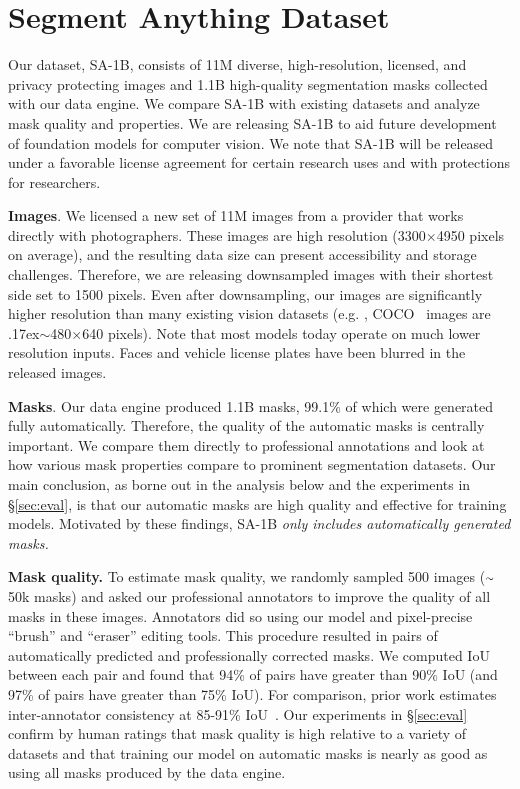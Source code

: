 \section{Segment Anything Dataset}\label{sec:dataset}

Our dataset, \mbox{SA-1B}, consists of 11M diverse, high-resolution, licensed, and privacy protecting images and 1.1B high-quality segmentation masks collected with our data engine. We compare \mbox{SA-1B} with existing datasets and analyze mask quality and properties. We are releasing \mbox{SA-1B} to aid future development of foundation models for computer vision. We note that \mbox{SA-1B} will be released under a favorable license agreement for certain research uses and with protections for researchers.

\textbf{Images}. We licensed a new set of 11M images from a provider that works directly with photographers. These images are high resolution (3300${\times}$4950 pixels on average), and the resulting data size can present accessibility and storage challenges. Therefore, we are releasing downsampled images with their shortest side set to 1500 pixels. Even after downsampling, our images are significantly higher resolution than many existing vision datasets (e.g. , COCO~\cite{Lin2014} images are \raise.17ex\hbox{$\scriptstyle\sim$}480${\times}$640 pixels). Note that most models today operate on much lower resolution inputs. Faces and vehicle license plates have been blurred in the released images.

\textbf{Masks}. Our data engine produced 1.1B masks, 99.1\% of which were generated fully automatically. Therefore, the quality of the automatic masks is centrally important. We compare them directly to professional annotations and look at how various mask properties compare to prominent segmentation datasets. Our main conclusion, as borne out in the analysis below and the experiments in \S\ref{sec:eval}, is that our automatic masks are high quality and effective for training models. Motivated by these findings, \mbox{SA-1B} \emph{only includes automatically generated masks.}

\textbf{Mask quality.} To estimate mask quality, we randomly sampled 500 images ($\raise.17ex\hbox{$\scriptstyle\sim$}$50k masks) and asked our professional annotators to improve the quality of all masks in these images. Annotators did so using our model and pixel-precise ``brush'' and ``eraser'' editing tools. This procedure resulted in pairs of automatically predicted and professionally corrected masks. We computed IoU between each pair and found that 94\% of pairs have greater than 90\% IoU (and 97\% of pairs have greater than 75\% IoU). For comparison, prior work estimates inter-annotator consistency at 85-91\% IoU~\cite{Gupta2019,OpenImages}. Our experiments in \S\ref{sec:eval} confirm by human ratings that mask quality is high relative to a variety of datasets and that training our model on automatic masks is nearly as good as using all masks produced by the data engine.


